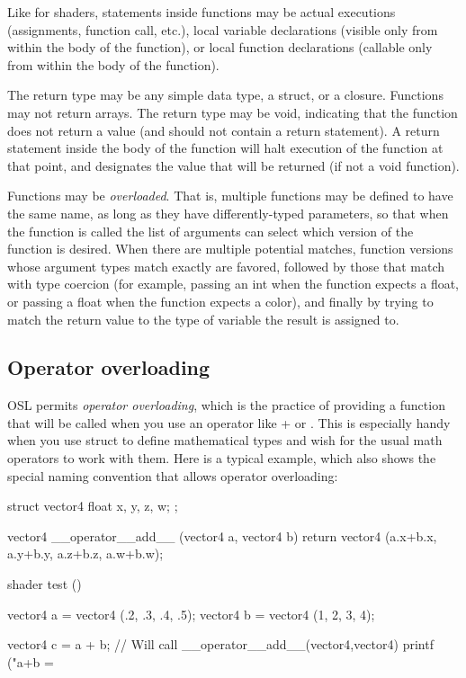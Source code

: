 \documentclass[11pt,letterpaper]{book}
\def\color{{\cf color}\xspace}
\begin{document}
Like for shaders, statements inside functions may be actual executions
(assignments, function call, etc.), local variable declarations (visible
only from within the body of the function), or local function
declarations (callable only from within the body of the function).

The return type may be any simple data type, a {\cf struct}, or a {\cf
  closure}.  Functions may not return arrays.  The return type may be
{\cf void}, indicating that the function does not return a value (and
should not contain a {\cf return} statement).  A {\cf return} statement
inside the body of the function will halt execution of the function at
that point, and designates the value that will be returned (if not a
{\cf void} function).

Functions may be \emph{overloaded}.  That is, multiple functions may be
defined to have the same name, as long as they have differently-typed
parameters, so that when the function is called the list of arguments can
select which version of the function is desired. When there are multiple
potential matches, function versions whose argument types match exactly are
favored, followed by those that match with type coercion (for example,
passing an {\cf int} when the function expects a {\cf float}, or passing a
{\cf float} when the function expects a \color), and finally by trying to
match the return value to the type of variable the result is assigned to.

\subsection{Operator overloading}
\label{sec:syntax:operatoroverloading}

OSL permits \emph{operator overloading}, which is the practice of providing
a function that will be called when you use an operator like {\cf +} or
{\cf *}. This is especially handy when you use {\cf struct} to define
mathematical types and wish for the usual math operators to work with them.
Here is a typical example, which also shows the special naming convention
that allows operator overloading:

\begin{code}
    struct vector4 {
        float x, y, z, w;
    };

    vector4 __operator__add__ (vector4 a, vector4 b) {
        return vector4 (a.x+b.x, a.y+b.y, a.z+b.z, a.w+b.w);
    }

    shader test ()
    {
        vector4 a = vector4 (.2, .3, .4, .5);
        vector4 b = vector4 (1, 2, 3, 4);

        vector4 c = a + b;   // Will call __operator__add__(vector4,vector4)
        printf ("a+b = %
    }
\end{code}
\end{document}
